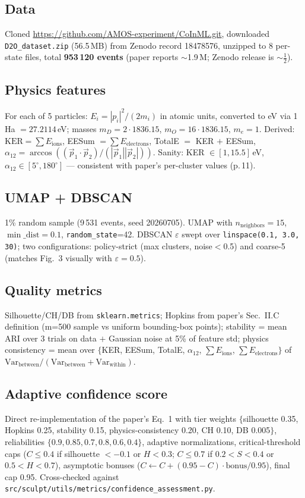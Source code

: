 \documentclass[11pt]{article}
\begin{document}
\subsection{Data}
Cloned \url{https://github.com/AMOS-experiment/CoInML.git}, downloaded \texttt{D2O\_dataset.zip} (56.5\,MB) from Zenodo record 18478576, unzipped to 8 per-state files, total \textbf{953\,120 events} (paper reports $\sim$1.9\,M; Zenodo release is $\sim\tfrac{1}{2}$).

\subsection{Physics features}
For each of 5 particles: $E_i = |p_i|^2/(2m_i)$ in atomic units, converted to eV via 1\,Ha $= 27.2114$\,eV; masses $m_D = 2\cdot 1836.15$, $m_O = 16\cdot 1836.15$, $m_e = 1$. Derived: $\text{KER} = \sum E_\text{ions}$, EESum $= \sum E_\text{electrons}$, TotalE $= $ KER $+$ EESum, $\alpha_{12} = \arccos((\vec p_1 \cdot \vec p_2)/(|\vec p_1||\vec p_2|))$. Sanity: KER $\in [1,15.5]$\,eV, $\alpha_{12} \in [5^\circ, 180^\circ]$ --- consistent with paper's per-cluster values (p.\,11).

\subsection{UMAP + DBSCAN}
1\% random sample (9\,531 events, seed 20260705). UMAP with $n_\text{neighbors}=15$, $\min\_\text{dist}=0.1$, \texttt{random\_state}=42. DBSCAN $\varepsilon$ swept over \texttt{linspace(0.1,\,3.0,\,30)}; two configurations: policy-strict (max clusters, noise$<$0.5) and coarse-5 (matches Fig.~3 visually with $\varepsilon = 0.5$).

\subsection{Quality metrics}
Silhouette/CH/DB from \texttt{sklearn.metrics}; Hopkins from paper's Sec.~II.C definition (m=500 sample vs uniform bounding-box points); stability = mean ARI over 3 trials on data $+$ Gaussian noise at 5\% of feature std; physics consistency = mean over $\{$KER, EESum, TotalE, $\alpha_{12}$, $\sum E_\text{ions}$, $\sum E_\text{electrons}\}$ of $\mathrm{Var}_\text{between}/(\mathrm{Var}_\text{between}+\mathrm{Var}_\text{within})$.

\subsection{Adaptive confidence score}
Direct re-implementation of the paper's Eq.~1 with tier weights $\{$silhouette 0.35, Hopkins 0.25, stability 0.15, physics-consistency 0.20, CH 0.10, DB 0.005$\}$, reliabilities $\{0.9,0.85,0.7,0.8,0.6,0.4\}$, adaptive normalizations, critical-threshold caps ($C \leq 0.4$ if silhouette $<-0.1$ or $H<0.3$; $C \leq 0.7$ if $0.2 < S < 0.4$ or $0.5 < H < 0.7$), asymptotic bonuses ($C \gets C + (0.95-C)\cdot\text{bonus}/0.95$), final cap 0.95. Cross-checked against \texttt{src/sculpt/utils/metrics/confidence\_assessment.py}.
\end{document}
